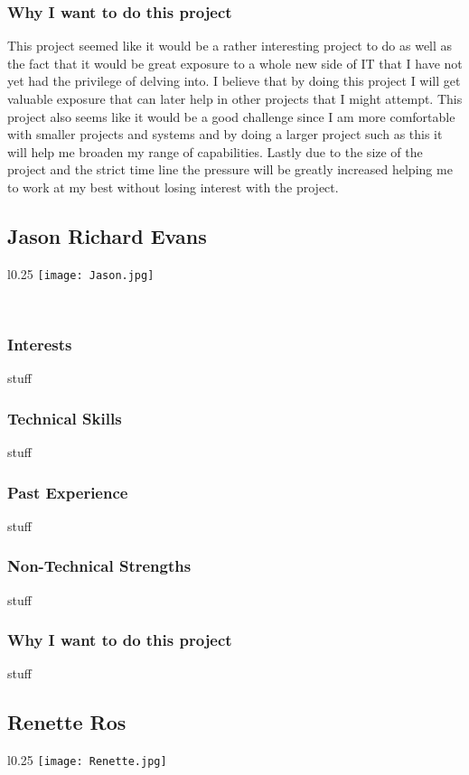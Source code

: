 \subsubsection{Why I want to do this project}
This project seemed like it would be a rather interesting project to do as well as the fact that it would be great exposure to a whole new side of IT that I have not yet had the privilege of delving into. I believe that by doing this project I will get valuable exposure that can later help in other projects that I might attempt. This project also seems like it would be a good challenge since I am more comfortable with smaller projects and systems and by doing a larger project such as this it will help me broaden my range of capabilities. Lastly due to the size of the project and the strict time line the pressure will be greatly increased helping me to work at my best without losing interest with the project. 

\subsection{Jason Richard Evans}
\begin{wrapfigure}[5]{l}{0.25\textwidth}
\vspace{10pt}
\texttt{[image: Jason.jpg]}
\end{wrapfigure}

\textcolor{white}{.}
\subsubsection{Interests} stuff 
\subsubsection{Technical Skills} stuff
\subsubsection{Past Experience} stuff 
\subsubsection{Non-Technical Strengths} stuff
\subsubsection{Why I want to do this project} stuff

\subsection{Renette Ros}
\begin{wrapfigure}[8]{l}{0.25\textwidth}
\vspace{10pt}
\texttt{[image: Renette.jpg]}
\vspace{10pt}
\end{wrapfigure}

